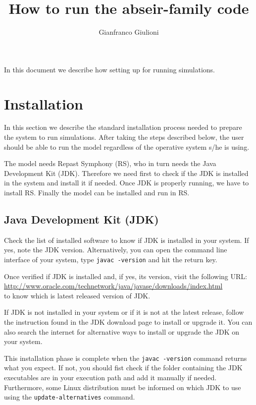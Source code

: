 \documentclass{article}
\title{How to run the abseir-family code}
\author{Gianfranco Giulioni}
\date{}
\begin{document}
\maketitle


In this document we describe how setting up for running simulations. 
\section{Installation}

In this section we describe the standard installation process needed to prepare the system to run simulations. After taking the steps described below, the user should be able to run the model regardless of the operative system s/he is using.

The model needs Repast Symphony (RS), who in turn needs the Java Development Kit (JDK). Therefore we need first to check if the JDK is installed in the system and install it if needed. Once JDK is properly running, we have to install RS. Finally the model can be installed and run in RS.

\subsection{Java Development Kit (JDK)}

Check the list of installed software to know if JDK is installed in your system. If yes, note the JDK version.
Alternatively, you can open the command line interface of your system, type \verb+javac -version+ and hit the return key. 

Once verified if JDK is installed and, if yes, its version, visit the following URL:\\
\url{http://www.oracle.com/technetwork/java/javase/downloads/index.html}\\
to know which is latest released version of JDK.

If JDK is not installed in your system or if it is not at the latest release, follow the instruction found in the JDK download page to install or upgrade it. You can also search the internet for alternative ways to install or upgrade the JDK on your system.

This installation phase is complete when the \verb+javac -version+ command returns what you expect.
If not, you should fist check if the folder containing the JDK executables are in your execution path and add it manually if needed.
Furthermore, some Linux distribution must be informed on which JDK to use using the \verb+update-alternatives+ command. 
\end{document}

